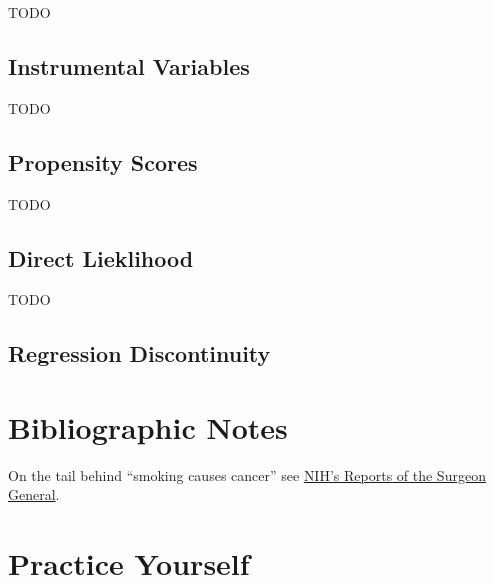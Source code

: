 \documentclass[]{book}
\theoremstyle{definition}
\theoremstyle{definition}
\theoremstyle{definition}
\theoremstyle{remark}
\begin{document}
TODO

\subsection{Instrumental Variables}\label{instrumental-variables}

TODO

\subsection{Propensity Scores}\label{propensity-scores}

TODO

\subsection{Direct Lieklihood}\label{direct-lieklihood}

TODO

\subsection{Regression Discontinuity}\label{regression-discontinuity}

\section{Bibliographic Notes}\label{bibliographic-notes-20}

On the tail behind ``smoking causes cancer'' see
\href{https://profiles.nlm.nih.gov/ps/retrieve/Narrative/NN/p-nid/60}{NIH's
Reports of the Surgeon General}.

\section{Practice Yourself}\label{practice-yourself-20}


\end{document}
